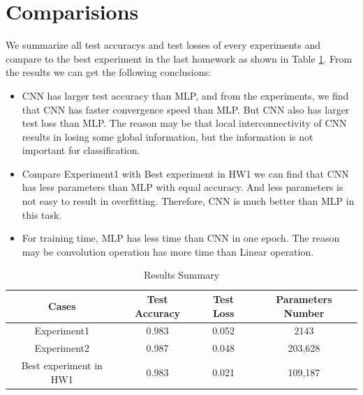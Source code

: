 \documentclass{elegantbook}
\begin{document}

\section{Comparisions}
We summarize all test accuracys and test losses of every experiments and compare to the best experiment in the last homework as shown in Table \ref{tab3}. From the results we can get the following conclusions:
\begin{itemize}
	\item CNN has larger test accuracy than MLP, and from the experiments, we find that CNN has faster convergence speed than MLP. But CNN also has larger test loss than MLP. The reason may be that local interconnectivity of CNN results in losing some global information, but the information is not important for classification.
	\item Compare Experiment1 with Best experiment in HW1 we can find that CNN has less parameters than MLP with equal accuracy. And less parameters is not easy to result in overfitting. Therefore, CNN is much better than MLP in this task.
	\item For training time, MLP has less time than CNN in one epoch. The reason may be convolution operation has more time than Linear operation.
\end{itemize}

\begin{table}[!ht]
	\centering
	\caption{\label{tab3}Results Summary}
	\begin{tabular}{|c|c|c|c|}
		\hline
		Cases & Test Accuracy & Test Loss & Parameters Number\\
		\hline
		Experiment1 & 0.983 & 0.052 & 2143\\
		\hline
		Experiment2 & {\color{red} 0.987} & 0.048 & 203,628\\
		\hline
		Best experiment in HW1 & 0.983 & {\color{green} 0.021} & 109,187\\
		\hline
	\end{tabular}
\end{table}
\end{document}
